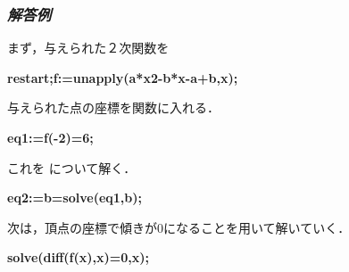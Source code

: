 \documentclass{article}
\begin{document}
\subsubsection{\textit{解答例}}
\begin{maplegroup}
\begin{Maple Normal}{
まず，与えられた２次関数を
}\end{Maple Normal}

\textbf{restart;}\textbf{f:=unapply(a*x2-b*x-a+b,x);}\mapleresult
\begin{maplelatex}
\end{maplelatex}
\end{maplegroup}
\begin{maplegroup}
\begin{Maple Normal}{
与えられた点の座標を関数に入れる．}\end{Maple Normal}

\textbf{eq1:=f(-2)=6;}\mapleresult
\begin{maplelatex}
\end{maplelatex}
\end{maplegroup}
\begin{maplegroup}
\begin{Maple Normal}{
これを
について解く．}\end{Maple Normal}

\textbf{eq2:=b=solve(eq1,b);}\mapleresult
\begin{maplelatex}
\end{maplelatex}
\end{maplegroup}
\begin{maplegroup}
\begin{Maple Normal}{
次は，頂点の座標で傾きが0になることを用いて解いていく．}\end{Maple Normal}

\textbf{solve(diff(f(x),x)=0,x);}\mapleresult
\begin{maplelatex}
\end{maplelatex}
\end{maplegroup}
\end{document}
